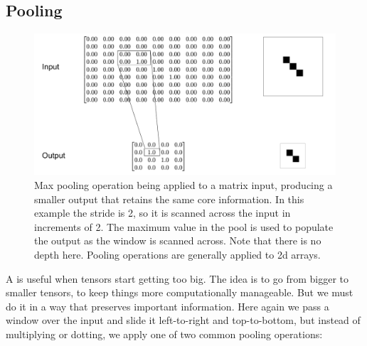 
\subsection{Pooling}


\begin{figure}[h]
\centering
\includegraphics[scale=.3]{./images/maxPooling.png}
\caption[Jeff Yoshimi ]{Max pooling operation being applied to a matrix input, producing a smaller output that retains the same core information. In this example the stride is 2, so it is scanned across the input in increments of 2. The maximum value in the pool is used to populate the output as the window is scanned across. Note that there is no depth here. Pooling operations are generally applied to 2d arrays.}
\label{maxPooling}
\end{figure}

A  is useful when tensors start getting too big. The idea is to go from bigger to smaller tensors, to keep things more computationally manageable. But we must do it in a way that preserves important information. Here again we pass a window over the input and slide it left-to-right and top-to-bottom, but instead of multiplying or dotting, we apply one of two common pooling operations:

